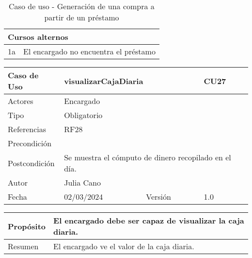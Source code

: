 \begin{table}[H]
	\centering
	\begin{tabular}{| m{} | m{} | m{} | m{} |}
		\hline
		\multicolumn{4}{|m{0.9\textwidth}|}{Cursos alternos}     \\ 
		\hline
		1a & \multicolumn{3}{m{0.67\textwidth}|}{El encargado no encuentra el préstamo} \\ 
		\hline
	\end{tabular}
	\caption{Caso de uso - Generación de una compra a partir de un préstamo}
\end{table}

\newpage


\begin{table}[H]
	\centering
	\begin{tabular}{| m{} | m{} | m{} | m{}|}
		\hline
		\rowcolor{grayshade} Caso de Uso & \multicolumn{2}{|m{0.43\textwidth}|}{visualizarCajaDiaria} &  CU27\\ 
		\hline
		Actores & \multicolumn{3}{l|}{Encargado} \\ 
		\hline
		Tipo & \multicolumn{3}{l|}{Obligatorio} \\ 
		\hline
		Referencias & \multicolumn{3}{l|}{RF28} \\ 
		\hline
		Precondición & \multicolumn{3}{m{0.67\textwidth}|}{} \\ 
		\hline
		Postcondición & \multicolumn{3}{m{0.67\textwidth}|}{Se muestra el cómputo de dinero recopilado en el día.} \\ 
		\hline
		Autor & \multicolumn{3}{l|}{Julia Cano} \\ 
		\hline
		Fecha & 02/03/2024 & Versión & 1.0 \\
		\hline
	\end{tabular}
\end{table}

\begin{table}[H]
	\centering
	\begin{tabular}{| m{} | m{} | m{} | m{} |}
		\hline
		Propósito & \multicolumn{3}{m{0.67\textwidth}|}{El encargado debe ser capaz de visualizar la caja diaria.}  \\ 
		\hline
		Resumen & \multicolumn{3}{m{0.67\textwidth}|}{El encargado ve el valor de la caja diaria.} \\ 
		\hline
	\end{tabular}
\end{table}


